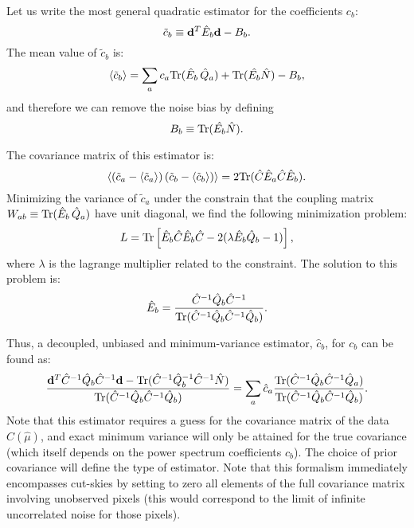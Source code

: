 \documentclass[a4paper,10pt]{article}
\newcommand{\Tr}{{\rm Tr}}
\begin{document}
Let us write the most general quadratic estimator for the coefficients $c_b$:
\begin{equation}
 \tilde{c}_b\equiv {\bf d}^T\hat{E}_b{\bf d}-B_b.
\end{equation}
The mean value of $\tilde{c}_b$ is:
\begin{equation}
 \langle\tilde{c}_b\rangle=\sum_a c_a\Tr(\hat{E}_b\,\hat{Q}_a)+\Tr(\hat{E_b}\hat{N})-B_b,
\end{equation}
and therefore we can remove the noise bias by defining
\begin{equation}
  B_b\equiv\Tr(\hat{E_b}\hat{N}).
\end{equation}

The covariance matrix of this estimator is:
\begin{equation}
 \left\langle(\tilde{c}_a-\langle\tilde{c}_a\rangle)\,(\tilde{c}_b-\langle\tilde{c}_b\rangle)\right\rangle=2\Tr(\hat{C}\hat{E}_a\hat{C}\hat{E}_b).
\end{equation}
Minimizing the variance of $\tilde{c}_a$ under the constrain that the coupling matrix $W_{ab}\equiv\Tr(\hat{E}_b\,\hat{Q}_a)$ have unit
diagonal, we find the following minimization problem:
\begin{equation}
  L=\Tr\left[\hat{E}_b\hat{C}\hat{E}_b\hat{C}-2(\lambda\hat{E}_b\hat{Q}_b-1)\right],
\end{equation}
where $\lambda$ is the lagrange multiplier related to the constraint. The solution to this problem is:
\begin{equation}
 \hat{E}_b=\frac{\hat{C}^{-1}\hat{Q}_b\hat{C}^{-1}}{\Tr(\hat{C}^{-1}\hat{Q}_b\hat{C}^{-1}\hat{Q}_b)}.
\end{equation}

Thus, a decoupled, unbiased and minimum-variance estimator, $\hat{c}_b$, for $c_b$ can be found as:
\begin{equation}
 \frac{{\bf d}^T\hat{C}^{-1}\hat{Q}_b\hat{C}^{-1}{\bf d}-\Tr(\hat{C}^{-1}\hat{Q}_b^{-1}\hat{C}^{-1}\hat{N})}
 {\Tr(\hat{C}^{-1}\hat{Q}_b\hat{C}^{-1}\hat{Q}_b)}
 =\sum_a \hat{c}_a\frac{\Tr(\hat{C}^{-1}\hat{Q}_b\hat{C}^{-1}\hat{Q}_a)}
 {\Tr(\hat{C}^{-1}\hat{Q}_b\hat{C}^{-1}\hat{Q}_b)}.
\end{equation}
Note that this estimator requires a guess for the covariance matrix of the data $C(\hat{\mu})$, and exact
minimum variance will only be attained for the true covariance (which itself depends on the power spectrum coefficients $c_b$).
The choice of prior covariance will define the type of estimator. Note that this formalism immediately encompasses cut-skies by
setting to zero all elements of the full covariance matrix involving unobserved pixels (this would correspond to the limit of
infinite uncorrelated noise for those pixels).
\end{document}
